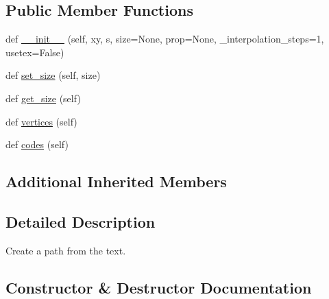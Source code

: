 \subsection*{Public Member Functions}
\begin{DoxyCompactItemize}
\item 
def \hyperlink{classmatplotlib_1_1textpath_1_1TextPath_ac6cc130b10544138962c567947ecfecb}{\+\_\+\+\_\+init\+\_\+\+\_\+} (self, xy, s, size=None, prop=None, \+\_\+interpolation\+\_\+steps=1, usetex=False)
\item 
def \hyperlink{classmatplotlib_1_1textpath_1_1TextPath_a01b26cef7fa4a7dfc5c734e028abfbd7}{set\+\_\+size} (self, size)
\item 
def \hyperlink{classmatplotlib_1_1textpath_1_1TextPath_ac89396b97c97d66b09e142f9e239fa33}{get\+\_\+size} (self)
\item 
def \hyperlink{classmatplotlib_1_1textpath_1_1TextPath_af1a6127a9fae5aa4cd72ce585252c79f}{vertices} (self)
\item 
def \hyperlink{classmatplotlib_1_1textpath_1_1TextPath_a6a09226cb71d869cec23bd250be40244}{codes} (self)
\end{DoxyCompactItemize}
\subsection*{Additional Inherited Members}


\subsection{Detailed Description}
\begin{DoxyVerb}Create a path from the text.
\end{DoxyVerb}
 

\subsection{Constructor \& Destructor Documentation}
\mbox{\label{classmatplotlib_1_1textpath_1_1TextPath_ac6cc130b10544138962c567947ecfecb}} 
